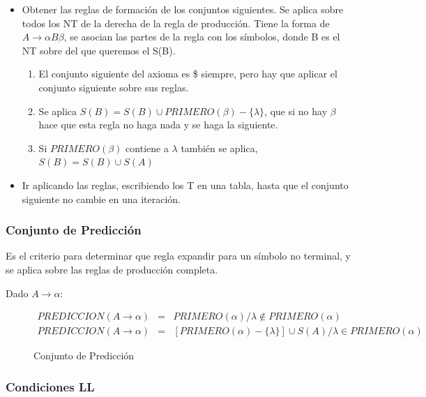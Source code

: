\documentclass[12pt, twoside, openright]{report} %
\begin{document}
\begin{itemize}
	\item Obtener las reglas de formación de los conjuntos siguientes. Se aplica
	      sobre todos los NT de la derecha de la regla de producción. Tiene la
	      forma de \(A \rightarrow \alpha B \beta\), se asocian las partes de la
	      regla con los símbolos, donde B es el NT sobre del que queremos el
	      S(B).

	      \begin{enumerate}
		      \def\labelenumi{\arabic{enumi}.}
		      \item El conjunto siguiente del axioma es \$ siempre, pero hay que aplicar
		            el conjunto siguiente sobre sus reglas.
		      \item Se aplica \(S(B)=S(B)\cup PRIMERO(\beta)-\{\lambda\}\), que si no hay
		            \(\beta\) hace que esta regla no haga nada y se haga la siguiente.
		      \item Si \(PRIMERO(\beta)\) contiene a \(\lambda\) también se aplica,
		            \(S(B)=S(B)\cup S(A)\)
	      \end{enumerate}
	\item Ir aplicando las reglas, escribiendo los T en una tabla, hasta que el
	      conjunto siguiente no cambie en una iteración.
\end{itemize}

\subsubsection{Conjunto de Predicción}

Es el criterio para determinar que regla expandir para un símbolo no
terminal, y se aplica sobre las reglas de producción completa.

Dado \(A \rightarrow \alpha\):

\begin{figure}[H]
	\begin{eqnarray*}
		PREDICCION(A \rightarrow \alpha) &=& PRIMERO(\alpha) / \lambda \notin PRIMERO(\alpha) \\
		PREDICCION(A \rightarrow \alpha) &=& [PRIMERO(\alpha)-\{\lambda\}] \cup S(A) / \lambda \in PRIMERO(\alpha)
	\end{eqnarray*}

	\captionsetup{justification=centering}
	\caption{Conjunto de Predicción}
\end{figure}

\pagebreak
\subsubsection{Condiciones LL}
\end{document}
